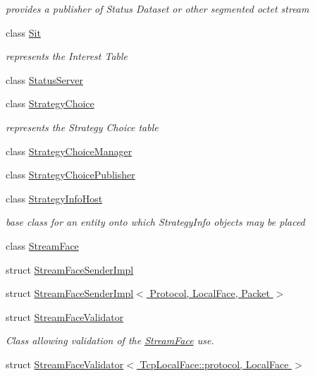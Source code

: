 \begin{DoxyCompactItemize}
\begin{DoxyCompactList}\small\item\em provides a publisher of Status Dataset or other segmented octet stream \end{DoxyCompactList}\item 
class \hyperlink{classnfd_1_1Sit}{Sit}
\begin{DoxyCompactList}\small\item\em represents the Interest Table \end{DoxyCompactList}\item 
class \hyperlink{classnfd_1_1StatusServer}{Status\+Server}
\item 
class \hyperlink{classnfd_1_1StrategyChoice}{Strategy\+Choice}
\begin{DoxyCompactList}\small\item\em represents the Strategy Choice table \end{DoxyCompactList}\item 
class \hyperlink{classnfd_1_1StrategyChoiceManager}{Strategy\+Choice\+Manager}
\item 
class \hyperlink{classnfd_1_1StrategyChoicePublisher}{Strategy\+Choice\+Publisher}
\item 
class \hyperlink{classnfd_1_1StrategyInfoHost}{Strategy\+Info\+Host}
\begin{DoxyCompactList}\small\item\em base class for an entity onto which Strategy\+Info objects may be placed \end{DoxyCompactList}\item 
class \hyperlink{classnfd_1_1StreamFace}{Stream\+Face}
\item 
struct \hyperlink{structnfd_1_1StreamFaceSenderImpl}{Stream\+Face\+Sender\+Impl}
\item 
struct \hyperlink{structnfd_1_1StreamFaceSenderImpl_3_01Protocol_00_01LocalFace_00_01Packet_01_4}{Stream\+Face\+Sender\+Impl$<$ Protocol, Local\+Face, Packet $>$}
\item 
struct \hyperlink{structnfd_1_1StreamFaceValidator}{Stream\+Face\+Validator}
\begin{DoxyCompactList}\small\item\em Class allowing validation of the \hyperlink{classnfd_1_1StreamFace}{Stream\+Face} use. \end{DoxyCompactList}\item 
struct \hyperlink{structnfd_1_1StreamFaceValidator_3_01TcpLocalFace_1_1protocol_00_01LocalFace_01_4}{Stream\+Face\+Validator$<$ Tcp\+Local\+Face\+::protocol, Local\+Face $>$}

\end{DoxyCompactItemize}
